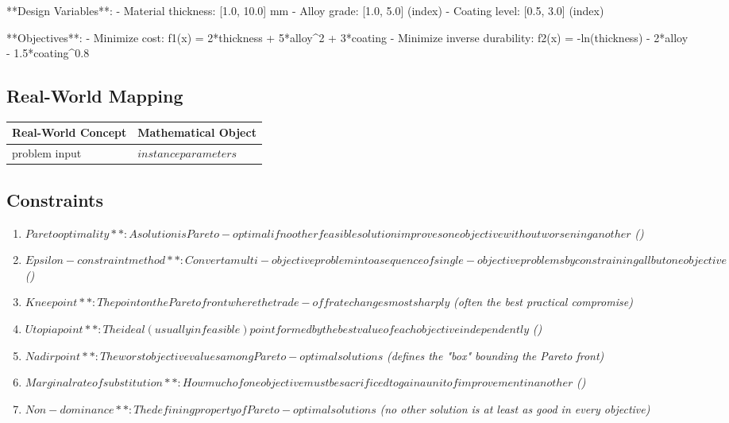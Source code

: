 \documentclass[11pt, a4paper]{article}
\begin{document}
**Design Variables**:
- Material thickness: [1.0, 10.0] mm
- Alloy grade: [1.0, 5.0] (index)
- Coating level: [0.5, 3.0] (index)

**Objectives**:
- Minimize cost: f1(x) = 2*thickness + 5*alloy\textasciicircum{}2 + 3*coating
- Minimize inverse durability: f2(x) = -ln(thickness) - 2*alloy - 1.5*coating\textasciicircum{}0.8

\subsection{Real-World Mapping}

\begin{longtable}{ll}
\toprule
\textbf{Real-World Concept} & \textbf{Mathematical Object} \\
\midrule
\endhead
problem input & $instance parameters$ \\
\bottomrule
\end{longtable}

\subsection{Constraints}

\begin{enumerate}
  \item $Pareto optimality**: A solution is Pareto-optimal if no other feasible solution improves one objective without worsening another$
  \hfill \textit{()}
  \item $Epsilon-constraint method**: Convert a multi-objective problem into a sequence of single-objective problems by constraining all but one objective$
  \hfill \textit{()}
  \item $Knee point**: The point on the Pareto front where the trade-off rate changes most sharply$
  \hfill \textit{(often the best practical compromise)}
  \item $Utopia point**: The ideal (usually infeasible) point formed by the best value of each objective independently$
  \hfill \textit{()}
  \item $Nadir point**: The worst objective values among Pareto-optimal solutions$
  \hfill \textit{(defines the "box" bounding the Pareto front)}
  \item $Marginal rate of substitution**: How much of one objective must be sacrificed to gain a unit of improvement in another$
  \hfill \textit{()}
  \item $Non-dominance**: The defining property of Pareto-optimal solutions$
  \hfill \textit{(no other solution is at least as good in every objective)}
\end{enumerate}
\end{document}
